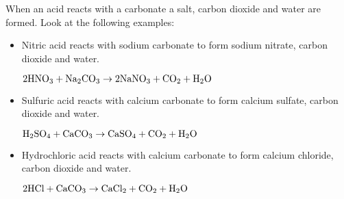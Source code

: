 When an acid reacts with a carbonate a salt, carbon dioxide and water are formed. Look at the following examples:\\

\begin{itemize}
\item{Nitric acid reacts with sodium carbonate to form sodium nitrate, carbon dioxide and water.
\begin{center}
$\rm{2HNO_{3} + Na_{2}CO_{3} \rightarrow 2NaNO_{3} + CO_{2} + H_{2}O}$\\
\end{center}
}
\item{Sulfuric acid reacts with calcium carbonate to form calcium sulfate, carbon dioxide and water.
\begin{center}
$\rm{H_{2}SO_{4} + CaCO_{3} \rightarrow CaSO_{4} + CO_{2} + H_{2}O}$\\
\end{center}
}
\item{Hydrochloric acid reacts with calcium carbonate to form calcium chloride, carbon dioxide and water.
\begin{center}
$\rm{2HCl + CaCO_{3} \rightarrow CaCl_{2} + CO_{2} + H_{2}O}$ 
\end{center}
}
\end{itemize}


